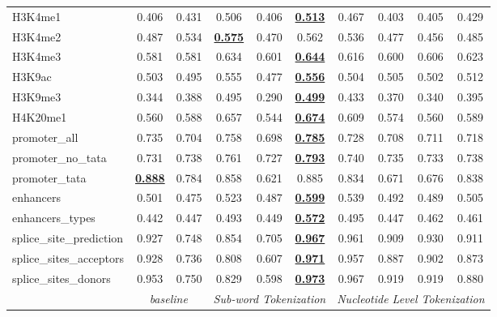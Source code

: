 \begin{table*}[h!]
\begin{center}
\begin{tabular}{l|cc|ccc|cccc}
H3K4me1 & 0.406 & 0.431 & 0.506 & 0.406 & {\ul \textbf{0.513}} & 0.467 & 0.403 & 0.405 & 0.429 \\
H3K4me2 & 0.487 & 0.534 & {\ul \textbf{0.575}} & 0.470 & 0.562 & 0.536 & 0.477 & 0.456 & 0.485 \\
H3K4me3 & 0.581 & 0.581 & 0.634 & 0.601 & {\ul \textbf{0.644}} & 0.616 & 0.600 & 0.606 & 0.623 \\
H3K9ac & 0.503 & 0.495 & 0.555 & 0.477 & {\ul \textbf{0.556}} & 0.504 & 0.505 & 0.502 & 0.512 \\
H3K9me3 & 0.344 & 0.388 & 0.495 & 0.290 & {\ul \textbf{0.499}} & 0.433 & 0.370 & 0.340 & 0.395 \\
H4K20me1 & 0.560 & 0.588 & 0.657 & 0.544 & {\ul \textbf{0.674}} & 0.609 & 0.574 & 0.560 & 0.589 \\
promoter\_all & 0.735 & 0.704 & 0.758 & 0.698 & {\ul \textbf{0.785}} & 0.728 & 0.708 & 0.711 & 0.718 \\
promoter\_no\_tata & 0.731 & 0.738 & 0.761 & 0.727 & {\ul \textbf{0.793}} & 0.740 & 0.735 & 0.733 & 0.738 \\
promoter\_tata & {\ul \textbf{0.888}} & 0.784 & 0.858 & 0.621 & 0.885 & 0.834 & 0.671 & 0.676 & 0.838 \\
enhancers & 0.501 & 0.475 & 0.523 & 0.487 & {\ul \textbf{0.599}} & 0.539 & 0.492 & 0.489 & 0.505 \\
enhancers\_types & 0.442 & 0.447 & 0.493 & 0.449 & {\ul \textbf{0.572}} & 0.495 & 0.447 & 0.462 & 0.461 \\
splice\_site\_prediction & 0.927 & 0.748 & 0.854 & 0.705 & {\ul \textbf{0.967}} & 0.961 & 0.909 & 0.930 & 0.911 \\
splice\_sites\_acceptors & 0.928 & 0.736 & 0.808 & 0.607 & {\ul \textbf{0.971}} & 0.957 & 0.887 & 0.902 & 0.873 \\
splice\_sites\_donors & 0.953 & 0.750 & 0.829 & 0.598 & {\ul \textbf{0.973}} & 0.967 & 0.919 & 0.919 & 0.880 \\
\hline
\multicolumn{1}{l|}{} & \multicolumn{2}{c|}{\textit{baseline}} & \multicolumn{3}{c|}{\textit{Sub-word Tokenization}} & \multicolumn{4}{c}{\textit{Nucleotide Level Tokenization}} \\ \hline
\end{tabular}
\end{center}
\end{table*}